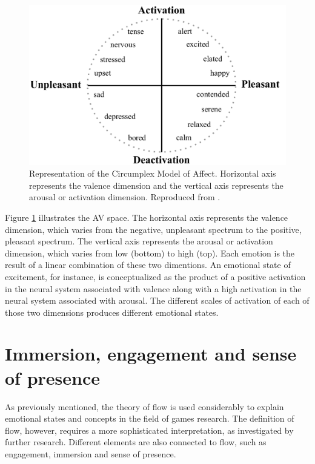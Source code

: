 \begin{figure}[h!]
    \centering
    \includegraphics[scale=0.5]{Content/figures/russell-av}
    \caption{Representation of the Circumplex Model of Affect. Horizontal axis represents the valence dimension and the vertical axis represents the arousal or activation dimension. Reproduced from \textcite{posner2005circumplex}.}
    \label{fig:av-model}
\end{figure}

Figure \ref{fig:av-model} illustrates the AV space. The horizontal axis represents the valence dimension, which varies from the negative, unpleasant spectrum to the positive, pleasant spectrum. The vertical axis represents the arousal or activation dimension, which varies from low (bottom) to high (top). Each emotion is the result of a linear combination of these two dimentions. An emotional state of excitement, for instance, is conceptualized as the product of a positive activation in the neural system associated with valence along with a high activation in the neural system associated with arousal. The different scales of activation of each of those two dimensions produces different emotional states.

\section{Immersion, engagement and sense of presence}

As previously mentioned, the theory of flow is used considerably to explain emotional states and concepts in the field of games research. The definition of flow, however, requires a more sophisticated interpretation, as investigated by further research. %
Different elements are also connected to flow, such as engagement, immersion and sense of presence.

